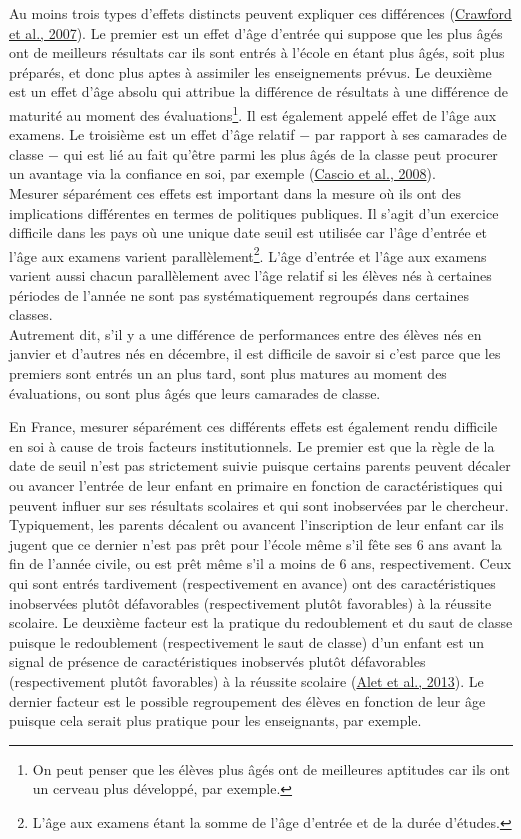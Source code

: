 \documentclass[
]{book}
\begin{document}
\quad Au moins trois types d'effets distincts peuvent expliquer ces différences (\protect\hyperlink{ref-CRA:eal:07}{Crawford et al., 2007}). Le premier est un effet d'âge d'entrée qui suppose que les plus âgés ont de meilleurs résultats car ils sont entrés à l'école en étant plus âgés, soit plus préparés, et donc plus aptes à assimiler les enseignements prévus. Le deuxième est un effet d'âge absolu qui attribue la différence de résultats à une différence de maturité au moment des évaluations\footnote{On peut penser que les élèves plus âgés ont de meilleures aptitudes car ils ont un cerveau plus développé, par exemple.}. Il est également appelé effet de l'âge aux examens. Le troisième est un effet d'âge relatif \(-\) par rapport à ses camarades de classe \(-\) qui est lié au fait qu'être parmi les plus âgés de la classe peut procurer un avantage via la confiance en soi, par exemple (\protect\hyperlink{ref-CAS:08}{Cascio et al., 2008}).\\
Mesurer séparément ces effets est important dans la mesure où ils ont des implications différentes en termes de politiques publiques. Il s'agit d'un exercice difficile dans les pays où une unique date seuil est utilisée car l'âge d'entrée et l'âge aux examens varient parallèlement\footnote{L'âge aux examens étant la somme de l'âge d'entrée et de la durée d'études.}. L'âge d'entrée et l'âge aux examens varient aussi chacun parallèlement avec l'âge relatif si les élèves nés à certaines périodes de l'année ne sont pas systématiquement regroupés dans certaines classes.\\
Autrement dit, s'il y a une différence de performances entre des élèves nés en janvier et d'autres nés en décembre, il est difficile de savoir si c'est parce que les premiers sont entrés un an plus tard, sont plus matures au moment des évaluations, ou sont plus âgés que leurs camarades de classe.

\quad En France, mesurer séparément ces différents effets est également rendu difficile en soi à cause de trois facteurs institutionnels. Le premier est que la règle de la date de seuil n'est pas strictement suivie puisque certains parents peuvent décaler ou avancer l'entrée de leur enfant en primaire en fonction de caractéristiques qui peuvent influer sur ses résultats scolaires et qui sont inobservées par le chercheur. Typiquement, les parents décalent ou avancent l'inscription de leur enfant car ils jugent que ce dernier n'est pas prêt pour l'école même s'il fête ses 6 ans avant la fin de l'année civile, ou est prêt même s'il a moins de 6 ans, respectivement. Ceux qui sont entrés tardivement (respectivement en avance) ont des caractéristiques inobservées plutôt défavorables (respectivement plutôt favorables) à la réussite scolaire. Le deuxième facteur est la pratique du redoublement et du saut de classe puisque le redoublement (respectivement le saut de classe) d'un enfant est un signal de présence de caractéristiques inobservés plutôt défavorables (respectivement plutôt favorables) à la réussite scolaire (\protect\hyperlink{ref-ALE:eal:13}{Alet et al., 2013}). Le dernier facteur est le possible regroupement des élèves en fonction de leur âge puisque cela serait plus pratique pour les enseignants, par exemple.
\end{document}

